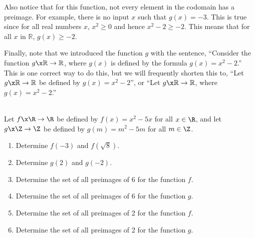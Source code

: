 \begin{example}
Also notice that for this function, not every element in the codomain has a preimage.  For example, there is no input  $x$  such that  $g\left( x \right) =  - 3$.  This is true since for all real numbers  $x$,  $x^2  \geq 0$  and hence  $x^2  - 2 \geq  - 2$.  This means that for all  $x$  in  $\mathbb{R}$, $g\left( x \right) \geq  - 2$.

Finally, note that we introduced the function $g$ with the sentence, ``Consider the function  
$g\x \mathbb{R} \to \mathbb{R}$, where  $g( x )$  is defined by the formula  
$g( x ) = x^2  - 2$.''  This is one correct way to do this, but we will frequently shorten this to, ``Let  $g\x \mathbb{R} \to \mathbb{R}$ be defined by  $g( x ) = x^2  - 2$'', or ``Let  
$g\x \mathbb{R} \to \mathbb{R}$, where  $g( x ) = x^2  - 2$.''
\end{example}


\begin{prog} \label{pr:images} \hfill \\
Let $f\x \R \to \R$ be defined by $f(x) = x^2 - 5x$ for all $x \in \R$, and let 
$g\x \Z \to \Z$ be defined by $g(m) = m^2 - 5m$ for all $m \in \Z$.

\begin{enumerate}
\item Determine $f ( -3 )$ and $f \left( \sqrt 8 \right)$.

\item Determine $g ( 2 )$ and $g ( -2 )$.

\item Determine the set of all preimages of 6 for the function $f$\!.

\item Determine the set of all preimages of 6 for the function $g$\!.

\item Determine the set of all preimages of 2 for the function $f$\!.

\item Determine the set of all preimages of 2 for the function $g$\!.
\end{enumerate}
\end{prog}
\hbreak


